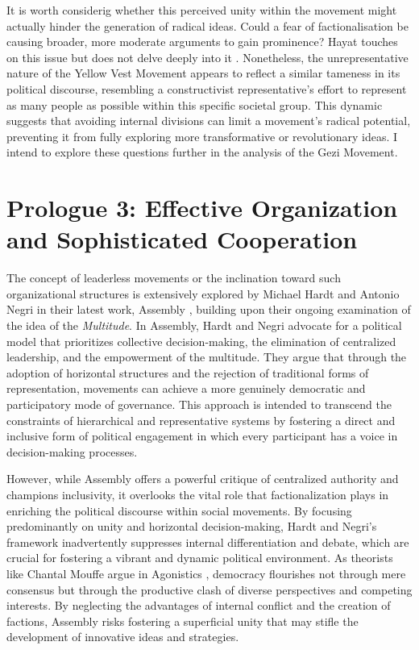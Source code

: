 It is worth considerig whether this perceived unity within the movement might actually hinder the generation of radical ideas. Could a fear of factionalisation be causing broader, more moderate arguments to gain prominence? Hayat touches on this issue but does not delve deeply into it \parencite[see 13-14]{hayat2024}. Nonetheless, the unrepresentative nature of the Yellow Vest Movement appears to reflect a similar tameness in its political discourse, resembling a constructivist representative’s effort to represent as many people as possible within this specific societal group. This dynamic suggests that avoiding internal divisions can limit a movement's radical potential, preventing it from fully exploring more transformative or revolutionary ideas. I intend to explore these questions further in the analysis of the Gezi Movement.

\section{Prologue 3: Effective Organization and Sophisticated Cooperation}

The concept of leaderless movements or the inclination toward such organizational structures is extensively explored by Michael Hardt and Antonio Negri in their latest work, Assembly \parencite[-]{hardt2017}, building upon their ongoing examination of the idea of the \textit{Multitude}. In Assembly, Hardt and Negri advocate for a political model that prioritizes collective decision-making, the elimination of centralized leadership, and the empowerment of the multitude. They argue that through the adoption of horizontal structures and the rejection of traditional forms of representation, movements can achieve a more genuinely democratic and participatory mode of governance. This approach is intended to transcend the constraints of hierarchical and representative systems by fostering a direct and inclusive form of political engagement in which every participant has a voice in decision-making processes.

However, while Assembly offers a powerful critique of centralized authority and champions inclusivity, it overlooks the vital role that factionalization plays in enriching the political discourse within social movements. By focusing predominantly on unity and horizontal decision-making, Hardt and Negri’s framework inadvertently suppresses internal differentiation and debate, which are crucial for fostering a vibrant and dynamic political environment. As theorists like Chantal Mouffe argue in Agonistics \parencite[-]{mouffe2013}, democracy flourishes not through mere consensus but through the productive clash of diverse perspectives and competing interests. By neglecting the advantages of internal conflict and the creation of factions, Assembly risks fostering a superficial unity that may stifle the development of innovative ideas and strategies.

